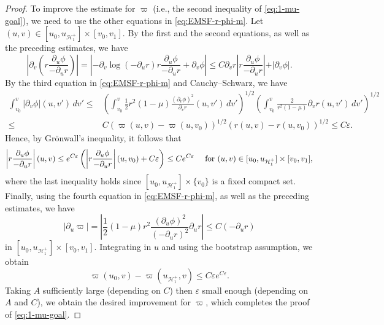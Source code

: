 \documentclass[10pt, reqno]{amsart}
\theoremstyle{definition}
\theoremstyle{remark}
\numberwithin{equation}{section}
\newcommand{\abs}[1]{\vert#1\vert}
\newcommand{\ud}{d}
\newcommand{\rd}{\partial}
\newcommand{\0}{\emptyset}
\newcommand{\veps}{\varepsilon}
\newcommand{\calH}{\mathcal H}
\newcommand{\EH}{\calH^{+}}
\begin{document}
\begin{proof}
To improve the estimate for $\varpi$ (i.e., the second inequality of \eqref{eq:1-mu-goal}), we need to use the other equations in \eqref{eq:EMSF-r-phi-m}. Let $(u, v) \in [u_{0}, u_{\EH_{1}}] \times [v_{0}, v_{1}]$. By the first and the second equations, as well as the preceding estimates, we have
\begin{equation*}
	\left\vert \rd_{v} \left( r \frac{\rd_{u} \phi}{- \rd_{u} r} \right) \right\vert
	= \left\vert - \rd_{v} \log (- \rd_{u} r ) r \frac{\rd_{u} \phi}{- \rd_{u} r} + \rd_{v} \phi \right\vert
	\leq C \rd_{v} r \left\vert r \frac{\rd_{u} \phi}{- \rd_{u} r} \right\vert + \abs{\rd_{v} \phi}.
\end{equation*}
By the third equation in \eqref{eq:EMSF-r-phi-m} and Cauchy--Schwarz, we have
 \begin{align*}
\int_{v_{0}}^{v} \abs{\rd_{v} \phi} (u, v')\, \ud v'
\leq & \left( \int_{v_{0}}^{v} \frac{1}{2} r^{2} (1-\mu) \frac{(\rd_{v} \phi)^{2}}{\rd_{v} r} (u, v')\, \ud v' \right)^{1/2}
\left(\int_{v_{0}}^{v} \frac{2}{r^{2} (1-\mu)} \rd_{v} r (u, v')\, \ud v' \right)^{1/2} \\
\leq & C (\varpi (u, v) - \varpi(u, v_{0}))^{1/2} (r(u, v) - r(u, v_{0}))^{1/2} \leq C \veps.
\end{align*}
Hence, by Gr\"onwall's inequality, it follows that
\begin{equation*}
	\left\vert r \frac{\rd_{u} \phi}{-\rd_{u} r}\right\vert	(u, v) \leq e^{C \veps} \left( \left\vert r \frac{\rd_{u} \phi}{-\rd_{u} r}\right\vert (u, v_{0}) + C \veps \right) \leq C e^{C \veps} \quad \hbox{ for } (u, v) \in [u_{0}, u_{\EH_{1}}] \times [v_{0}, v_{1}],
\end{equation*}
where the last inequality holds since $[u_{0}, u_{\EH_{1}}]\times \{v_{0}\}$ is a fixed compact set.
Finally, using the fourth equation in \eqref{eq:EMSF-r-phi-m}, as well as the preceding estimates, we have
\begin{equation*}
	\abs{\rd_{u} \varpi} = \left\vert \frac{1}{2} (1-\mu) r^{2} \frac{(\rd_{u} \phi)^{2}}{(-\rd_{u} r)^{2}} \rd_{u} r  \right\vert \leq C (-\rd_{u} r)
\end{equation*}
in $[u_{0}, u_{\EH_{1}}] \times [v_{0}, v_{1}]$. Integrating in $u$ and using the bootstrap assumption, we obtain
\begin{equation*}
	\varpi (u_{0}, v) - \varpi (u_{\EH_{1}}, v) \leq C \veps e^{C \veps}.
\end{equation*}
Taking $A$ sufficiently large (depending on $C$) then $\veps$ small enough (depending on $A$ and $C$), we obtain the desired improvement for $\varpi$, which completes the proof of \eqref{eq:1-mu-goal}.


\end{proof}
\end{document}
